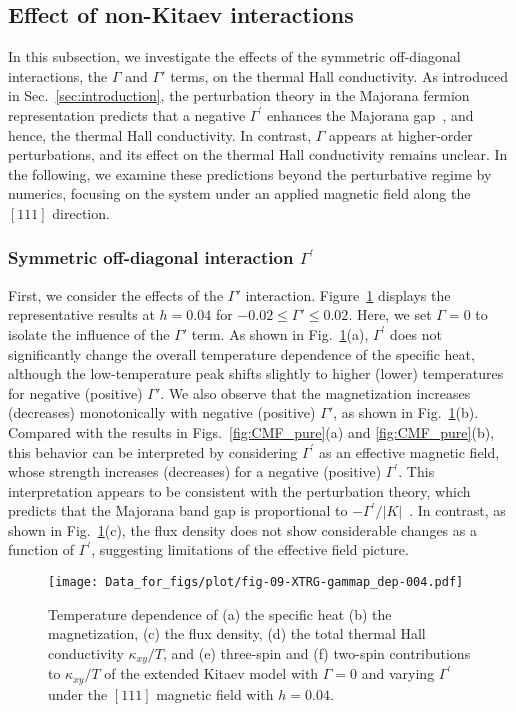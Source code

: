 \documentclass[twocolumn,superscriptaddress,showpacs, longbibliography, aps, prx]{revtex4-2}
\begin{document}
\subsection{Effect of non-Kitaev interactions}
\label{sec:Gamma}
In this subsection, we investigate the effects of the symmetric off-diagonal interactions, the $\Gamma$ and $\Gamma'$ terms, on the thermal Hall conductivity.
As introduced in Sec.~\ref{sec:introduction}, the perturbation theory in the Majorana fermion representation predicts that a negative $\Gamma^{\prime}$ enhances the Majorana gap~\cite{TakikawaF2020}, and hence, the thermal Hall conductivity. 
In contrast, $\Gamma$ appears at higher-order perturbations, and its effect on the thermal Hall conductivity remains unclear.
In the following, we examine these predictions beyond the perturbative regime by numerics, focusing on the system under an applied magnetic field along the $[111]$ direction.

\subsubsection{Symmetric off-diagonal interaction $\Gamma^{\prime}$}\label{subsec:Gamma_prime}
First, we consider the effects of the $\Gamma'$ interaction. 
Figure~\ref{fig:all_h0.04_Gp} displays the representative results at $h=0.04$ for $-0.02 \leq \Gamma' \leq 0.02$. 
Here, we set $\Gamma = 0$ to isolate the influence of the $\Gamma'$ term. 
As shown in Fig.~\ref{fig:all_h0.04_Gp}(a), $\Gamma^{\prime}$ does not significantly change 
the overall temperature dependence of the specific heat, although the low-temperature peak
shifts slightly to higher (lower) temperatures for negative (positive) $\Gamma'$. 
We also observe that the magnetization increases (decreases) monotonically with negative (positive) $\Gamma'$, as shown in Fig.~\ref{fig:all_h0.04_Gp}(b).
Compared with the results in Figs.~\ref{fig:CMF_pure}(a) and \ref{fig:CMF_pure}(b), this behavior can be interpreted by considering $\Gamma^{\prime}$ as an effective magnetic field, whose strength increases (decreases) for a negative (positive)  $\Gamma^{\prime}$. 
This interpretation appears to be consistent with the perturbation theory, which predicts that the Majorana band gap is proportional to $-\Gamma^{\prime}/|K|$~\cite{TakikawaF2020}. 
In contrast, as shown in Fig.~\ref{fig:all_h0.04_Gp}(c), the flux density does not show considerable changes as a function of $\Gamma^{\prime}$, suggesting limitations of the effective field picture.

\begin{figure}
  \begin{center}
    \texttt{[image: Data\_for\_figs/plot/fig-09-XTRG-gammap\_dep-004.pdf]}
  \end{center}
  \caption{Temperature dependence of (a) the specific heat (b) the magnetization, (c) the flux density, 
   (d) the total thermal Hall conductivity $\kappa_{xy}/T$, and
   (e) three-spin and (f) two-spin contributions to $\kappa_{xy}/T$ of the extended Kitaev model with $\Gamma=0$ and varying $\Gamma^{\prime}$ under the $[111]$ magnetic field with $h=0.04$.
  }
  \label{fig:all_h0.04_Gp}
\end{figure}
\end{document}
